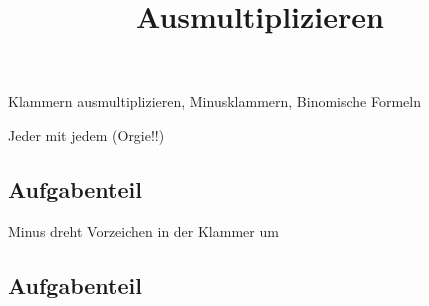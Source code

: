 \documentclass[solution]{uebungsblatt}
\title{Ausmultiplizieren}
\begin{document}
\maketitle
\begin{contents}
    Klammern ausmultiplizieren, Minusklammern, Binomische Formeln
\end{contents}


\begin{remark}{}
    Jeder mit jedem (Orgie!!)
\end{remark}

\subsection*{Aufgabenteil}

\begin{exercise}

\end{exercise}

\begin{exercise}

\end{exercise}

\begin{exercise}

\end{exercise}


\begin{remark}{}
    Minus dreht Vorzeichen in der Klammer um
\end{remark}

\subsection*{Aufgabenteil}

\begin{exercise}

\end{exercise}

\begin{exercise}

\end{exercise}

\newpage
\end{document}
